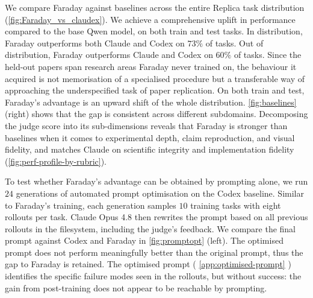 \documentclass[garamond,a4paper]{inherent}
\renewcommand{\sectionautorefname}{Section}%
\renewcommand{\subsectionautorefname}{Section}%
\renewcommand{\subsubsectionautorefname}{Section}%
\DeclareRobustCommand{\appref}[1]{%
  \begingroup
  \renewcommand{\sectionautorefname}{Appendix}%
  \renewcommand{\subsectionautorefname}{Appendix}%
  \renewcommand{\subsubsectionautorefname}{Appendix}%
  \autoref{#1}%
  \endgroup}
\newcommand{\faradayname}{Faraday\xspace}
\begin{document}
We compare \faradayname against baselines across the entire Replica task distribution (\autoref{fig:Faraday_vs_claudex}). We achieve a comprehensive uplift in performance compared to the base Qwen model, on both train and test tasks. In distribution, \faradayname outperforms both Claude and Codex on $73\%$ of tasks. Out of distribution, \faradayname outperforms Claude and Codex on $60\%$ of tasks. Since the held-out papers span research areas \faradayname never trained on, the behaviour it acquired is not memorisation of a specialised procedure but a transferable way of approaching the underspecified task of paper replication. On both train and test, Faraday's advantage is an upward shift of the whole distribution. \autoref{fig:baselines} (right) shows that the gap is consistent across different subdomains. Decomposing the judge score into its sub-dimensions reveals that \faradayname is stronger than baselines when it comes to experimental depth, claim reproduction, and visual fidelity, and matches Claude on scientific integrity and implementation fidelity (\autoref{fig:perf-profile-by-rubric}).

\newpage
To test whether \faradayname's advantage can be obtained by prompting alone, we run $24$ generations of automated prompt optimisation on the Codex baseline.
Similar to \faradayname's training, each generation samples $10$ training tasks with eight rollouts per task.
Claude Opus 4.8 then rewrites the prompt based on all previous rollouts in the filesystem, including the judge's feedback.
We compare the final prompt against Codex and Faraday in \autoref{fig:promptopt} (left).
The optimised prompt does not perform meaningfully better than the original prompt, thus the gap to Faraday is retained.
The optimised prompt (\appref{app:optimised-prompt}) identifies the specific failure modes seen in the rollouts, but without success:
the gain from post-training does not appear to be reachable by prompting. 
\end{document}
